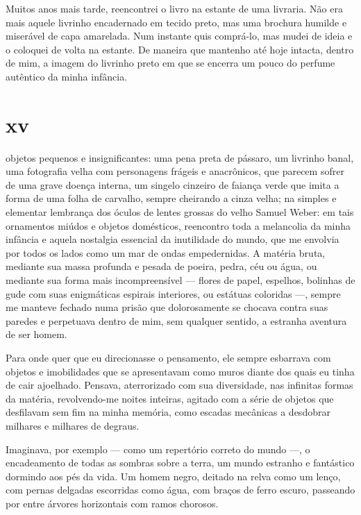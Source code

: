 Muitos anos mais tarde, reencontrei o livro na estante de uma livraria. Não
era mais aquele livrinho encadernado em tecido preto, mas uma brochura
humilde e miserável de capa amarelada. Num instante quis comprá-lo, mas mudei
de ideia e o coloquei de volta na estante. De maneira que mantenho até hoje
intacta, dentro de mim, a imagem do livrinho preto em que se encerra um pouco
do perfume autêntico da minha infância.

\section{xv} 

 objetos pequenos e insignificantes: uma pena preta de pássaro, um
 livrinho banal, uma fotografia velha com personagens frágeis e anacrônicos,
 que parecem sofrer de uma grave doença interna, um singelo cinzeiro de
 faiança verde que imita a forma de uma folha de carvalho, sempre cheirando a
 cinza velha; na simples e elementar lembrança dos óculos de lentes grossas
 do velho Samuel Weber: em tais ornamentos miúdos e objetos domésticos,
 reencontro toda a melancolia da minha infância e aquela nostalgia essencial
 da inutilidade do mundo, que me envolvia por todos os lados como um mar de
 ondas empedernidas. A matéria bruta, mediante sua massa profunda e pesada de
 poeira, pedra, céu ou água, ou mediante sua forma mais incompreensível ---
 flores de papel, espelhos, bolinhas de gude com suas enigmáticas espirais
 interiores, ou estátuas coloridas ---, sempre me manteve fechado numa prisão
 que dolorosamente se chocava contra suas paredes e perpetuava dentro de mim,
 sem qualquer sentido, a estranha aventura de ser homem.

Para onde quer que eu direcionasse o pensamento, ele sempre esbarrava com
objetos e imobilidades que se apresentavam como muros diante dos quais eu
tinha de cair ajoelhado. Pensava, aterrorizado com sua diversidade, nas
infinitas formas da matéria, revolvendo-me noites inteiras, agitado com a
série de objetos que desfilavam sem fim na minha memória, como escadas
mecânicas a desdobrar milhares e milhares de degraus.


Imaginava, por exemplo --- como um repertório correto do mundo ---, o
encadeamento de todas as sombras sobre a terra, um mundo estranho e
fantástico dormindo aos pés da vida. Um homem negro, deitado na relva como um
lenço, com pernas delgadas escorridas como água, com braços de ferro escuro,
passeando por entre árvores horizontais com ramos chorosos.

